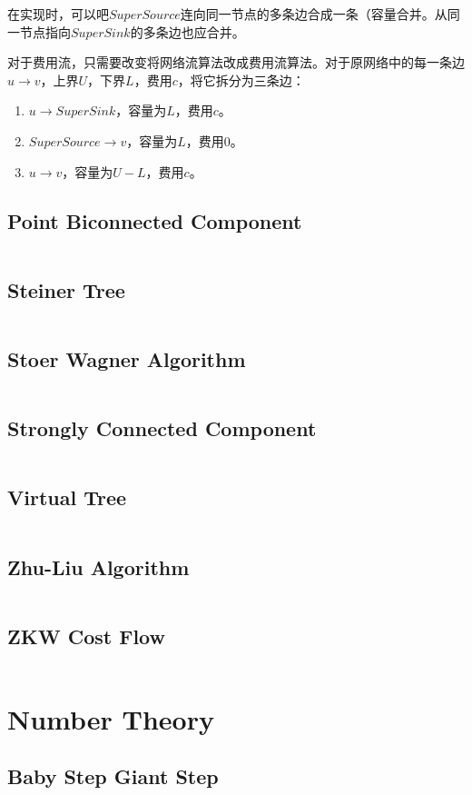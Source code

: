 \documentclass[a4paper,openany]{book}
\newcommand{\cppcode}[1]
{
  \inputminted[mathescape,
  tabsize=4,
  linenos,
  framesep=2mm,
  breakaftergroup=true,
  breakautoindent=true,
  breakbytoken=true,
  breaklines=true,
  fontsize=\small
  ]{cpp}{source/#1}
}
\begin{document}
在实现时，可以吧$SuperSource$连向同一节点的多条边合成一条（容量合并。从同一节点指向$SuperSink$的多条边也应合并。

对于费用流，只需要改变将网络流算法改成费用流算法。对于原网络中的每一条边$u \rightarrow v$，上界$U$，下界$L$，费用$c$，将它拆分为三条边：
\begin{enumerate}[(1)]
\item $u \rightarrow SuperSink$，容量为$L$，费用$c$。
\item $SuperSource \rightarrow v$，容量为$L$，费用$0$。
\item $u \rightarrow v$，容量为$U-L$，费用$c$。
\end{enumerate}
\section{Point Biconnected Component}
\cppcode{/Graph Theory/Point Biconnected Component.cpp}
\section{Steiner Tree}
\cppcode{/Graph Theory/Steiner Tree.cpp}
\section{Stoer Wagner Algorithm}
\cppcode{/Graph Theory/Stoer Wagner Algorithm.cpp}
\section{Strongly Connected Component}
\cppcode{/Graph Theory/Strongly Connected Component.cpp}
\section{Virtual Tree}
\cppcode{/Graph Theory/Virtual Tree.cpp}
\section{Zhu-Liu Algorithm}
\cppcode{/Graph Theory/Zhu-Liu Algorithm.cpp}
\section{ZKW Cost Flow}
\cppcode{/Graph Theory/ZKW Cost Flow.cpp}

\chapter{Number Theory}
\section{Baby Step Giant Step}
\cppcode{/Number Theory/Baby Step Giant Step.cpp}
\end{document}
